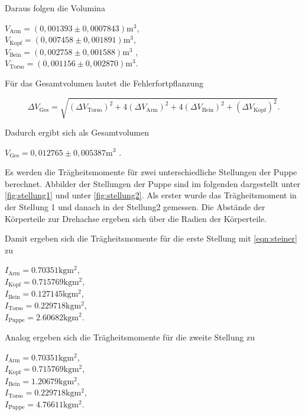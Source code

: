 Daraus folgen die Volumina

\begin{center}
  $V_{\text{Arm}} = (0,001393 \pm 0,0007843) \si{\meter}^3$, \\
  $V_{\text{Kopf}} = (0,007458 \pm 0,001891) \si{\meter}^3$, \\
  $V_{\text{Bein}} = (0,002758 \pm 0,001588) \si{\meter}^3$ ,\\
  $V_{\text{Torso}} = (0,001156 \pm 0,002870) \si{\meter}^3$. \\
\end{center}


Für das Gesamtvolumen lautet die Fehlerfortpflanzung

\begin{equation}
  \Delta V_{\text{Ges}} = \sqrt{(\Delta V_{\text{Torso}})^2 + 4(\Delta V_{\text{Arm}})^2 + 4(\Delta V_{\text{Bein}})^2 + (\Delta V_{\text{Kopf}})^2}.
\end{equation}


Dadurch ergibt sich als Gesamtvolumen

\begin{center}
  $V_{\text{Ges}} = 0,012765 \pm 0,005387 \si{\meter}^3$ .
\end{center}


Es werden die Trägheitsmomente für zwei unterschiedliche Stellungen der Puppe berechnet. Abbilder der Stellungen der Puppe sind im folgenden
dargestellt unter \autoref{fig:stellung1} und unter \autoref{fig:stellung2}. 
Als erster wurde das Trägheitsmoment in der Stellung 1 und danach in der Stellung2 gemessen.
Die Abstände der Körperteile zur Drehachse ergeben sich über die Radien der Körperteile.

Damit ergeben sich die Trägheitsmomente für die erste Stellung  mit \autoref{eqn:steiner} zu
\begin{center}
  $I_{\text{Arm}} = 0.70351 \si{\kilogram\meter^2}$, \\
  $I_{\text{Kopf}} = 0.715769 \si{\kilogram\meter^2}$, \\
  $I_{\text{Bein}} = 0.127145 \si{\kilogram\meter^2}$, \\
  $I_{\text{Torso}} = 0.229718 \si{\kilogram\meter^2}$, \\
  $I_{\text{Puppe}} = 2.60682 \si{\kilogram\meter^2}$. \\
\end{center}
Analog ergeben sich die Trägheitsmomente für die zweite Stellung zu
\begin{center}
  $I_{\text{Arm}} = 0.70351 \si{\kilogram\meter^2}$, \\
  $I_{\text{Kopf}} = 0.715769 \si{\kilogram\meter^2}$, \\
  $I_{\text{Bein}} = 1.20679 \si{\kilogram\meter^2}$, \\ 
  $I_{\text{Torso}} = 0.229718 \si{\kilogram\meter^2}$, \\
  $I_{\text{Puppe}} = 4.76611 \si{\kilogram\meter^2}$. \\
\end{center}


